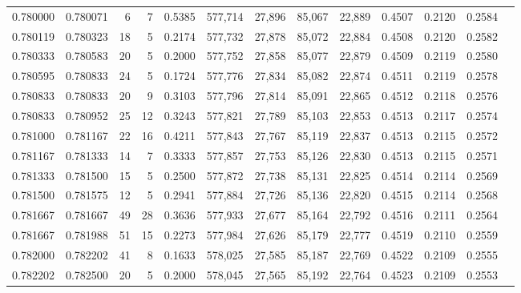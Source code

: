 \begin{tabular}{rrrrrrrrrrrrr}
0.780000 & 0.780071 &     6 &   7 &                                     0.5385 & 577,714 &  27,896 &  85,067 &  22,889 & 0.4507 & 0.2120 & 0.2584 \\
0.780119 & 0.780323 &    18 &   5 &                                     0.2174 & 577,732 &  27,878 &  85,072 &  22,884 & 0.4508 & 0.2120 & 0.2582 \\
0.780333 & 0.780583 &    20 &   5 &                                     0.2000 & 577,752 &  27,858 &  85,077 &  22,879 & 0.4509 & 0.2119 & 0.2580 \\
0.780595 & 0.780833 &    24 &   5 &                                     0.1724 & 577,776 &  27,834 &  85,082 &  22,874 & 0.4511 & 0.2119 & 0.2578 \\
0.780833 & 0.780833 &    20 &   9 &                                     0.3103 & 577,796 &  27,814 &  85,091 &  22,865 & 0.4512 & 0.2118 & 0.2576 \\
0.780833 & 0.780952 &    25 &  12 &                                     0.3243 & 577,821 &  27,789 &  85,103 &  22,853 & 0.4513 & 0.2117 & 0.2574 \\
0.781000 & 0.781167 &    22 &  16 &                                     0.4211 & 577,843 &  27,767 &  85,119 &  22,837 & 0.4513 & 0.2115 & 0.2572 \\
0.781167 & 0.781333 &    14 &   7 &                                     0.3333 & 577,857 &  27,753 &  85,126 &  22,830 & 0.4513 & 0.2115 & 0.2571 \\
0.781333 & 0.781500 &    15 &   5 &                                     0.2500 & 577,872 &  27,738 &  85,131 &  22,825 & 0.4514 & 0.2114 & 0.2569 \\
0.781500 & 0.781575 &    12 &   5 &                                     0.2941 & 577,884 &  27,726 &  85,136 &  22,820 & 0.4515 & 0.2114 & 0.2568 \\
0.781667 & 0.781667 &    49 &  28 &                                     0.3636 & 577,933 &  27,677 &  85,164 &  22,792 & 0.4516 & 0.2111 & 0.2564 \\
0.781667 & 0.781988 &    51 &  15 &                                     0.2273 & 577,984 &  27,626 &  85,179 &  22,777 & 0.4519 & 0.2110 & 0.2559 \\
0.782000 & 0.782202 &    41 &   8 &                                     0.1633 & 578,025 &  27,585 &  85,187 &  22,769 & 0.4522 & 0.2109 & 0.2555 \\
0.782202 & 0.782500 &    20 &   5 &                                     0.2000 & 578,045 &  27,565 &  85,192 &  22,764 & 0.4523 & 0.2109 & 0.2553 \\

\end{tabular}
